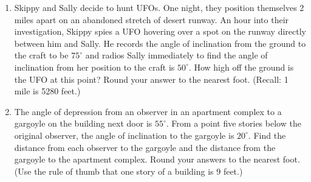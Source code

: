 \documentclass{ximera}
\begin{document}
\begin{enumerate}

\setcounter{enumi}{\value{HW}}

\item  \label{losincliniationdepressionexfirst} Skippy and Sally decide to hunt UFOs.  One night, they position themselves 2 miles apart on an abandoned stretch of desert runway.  An hour into their investigation, Skippy spies a UFO hovering over a spot on the runway directly between him and Sally.  He records the angle of inclination from the ground to the craft to be $75^{\circ}$ and radios Sally immediately to find the angle of inclination from her position to the craft is $50^{\circ}$.  How high off the ground is the UFO at this point?  Round your answer to the nearest foot.  (Recall:  1 mile is 5280 feet.)

\item  \label{losincliniationdepressionexlast} The angle of depression from an observer in an apartment complex to a gargoyle on the building next door is $55^{\circ}$.  From a point five stories below the original observer, the angle of inclination to the gargoyle is $20^{\circ}$.  Find the distance from each observer to the gargoyle and the distance from the gargoyle to the apartment complex.  Round your answers to the nearest foot.  (Use the rule of thumb that one story of a building is 9 feet.)  

\setcounter{HW}{\value{enumi}}

\end{enumerate}
\end{document}
